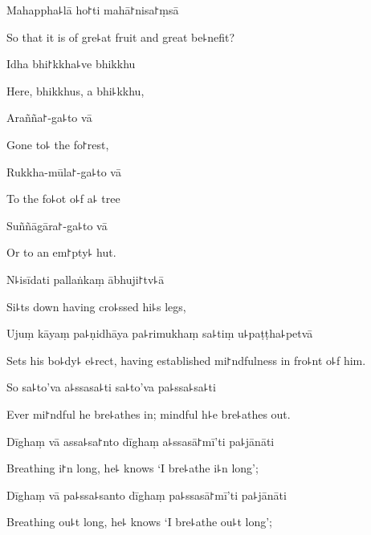 Mahappha꜕lā ho꜓ti mahā꜓nisa꜓ṃsā

\begin{english}
  So that it is of gre꜕at fruit and great be꜕nefit?
\end{english}

Idha bhi꜓kkha꜕ve bhikkhu

\begin{english}
  Here, bhikkhus, a bhi꜕kkhu,
\end{english}

Arañña꜓-ga꜕to vā

\begin{english}
  Gone to꜕ the fo꜓rest,
\end{english}

Rukkha-mūla꜓-ga꜕to vā

\begin{english}
  To the fo꜕ot o꜕f a꜕ tree
\end{english}

Suññāgāra꜓-ga꜕to vā

\begin{english}
  Or to an em꜓pty꜕ hut.
\end{english}

N꜕isīdati pallaṅkaṃ ābhuji꜓tv꜕ā

\begin{english}
  Si꜕ts down having cro꜕ssed hi꜕s legs,
\end{english}

Ujuṃ kāyaṃ pa꜕ṇidhāya pa꜕rimukhaṃ sa꜕tiṃ u꜕paṭṭha꜕petvā

\begin{english}
  Sets his bo꜕dy꜕ e꜕rect, having established mi꜓ndfulness in fro꜕nt o꜕f him.
\end{english}

So sa꜕to'va a꜕ssasa꜕ti sa꜕to'va pa꜕ssa꜕sa꜕ti

\begin{english}
  Ever mi꜓ndful he bre꜕athes in; mindful h꜕e bre꜕athes out.
\end{english}

Dīghaṃ vā assa꜕sa꜓nto dīghaṃ a꜕ssasā꜓mī'ti pa꜕jānāti

\begin{english}
  Breathing i꜓n long, he꜕ knows `I bre꜕athe i꜕n long';
\end{english}

Dīghaṃ vā pa꜕ssa꜕santo dīghaṃ pa꜕ssasā꜓mī'ti pa꜕jānāti

\begin{english}
  Breathing ou꜕t long, he꜕ knows `I bre꜕athe ou꜕t long';
\end{english}

